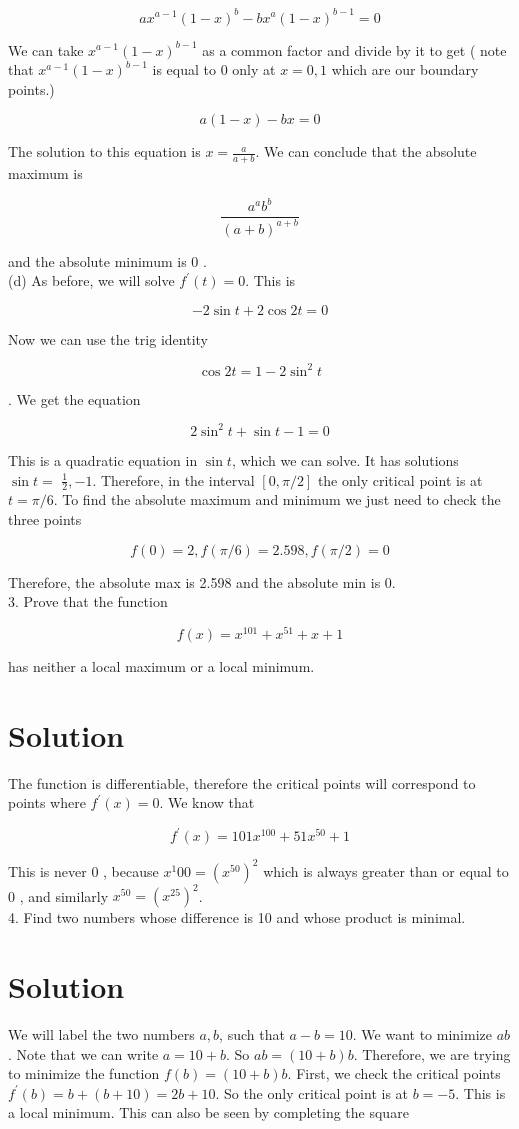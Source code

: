\documentclass[10pt]{article}
\begin{document}
$$
a x^{a-1}(1-x)^{b}-b x^{a}(1-x)^{b-1}=0
$$

We can take $x^{a-1}(1-x)^{b-1}$ as a common factor and divide by it to get ( note that $x^{a-1}(1-x)^{b-1}$ is equal to 0 only at $x=0,1$ which are our boundary points.)

$$
a(1-x)-b x=0
$$

The solution to this equation is $x=\frac{a}{a+b}$. We can conclude that the absolute maximum is

$$
\frac{a^{a} b^{b}}{(a+b)^{a+b}}
$$

and the absolute minimum is 0 .\\
(d) As before, we will solve $f^{\prime}(t)=0$. This is

$$
-2 \sin t+2 \cos 2 t=0
$$

Now we can use the trig identity

$$
\cos 2 t=1-2 \sin ^{2} t
$$

. We get the equation

$$
2 \sin ^{2} t+\sin t-1=0
$$

This is a quadratic equation in $\sin t$, which we can solve. It has solutions $\sin t=$ $\frac{1}{2},-1$. Therefore, in the interval $[0, \pi / 2]$ the only critical point is at $t=\pi / 6$. To find the absolute maximum and minimum we just need to check the three points

$$
f(0)=2, f(\pi / 6)=2.598, f(\pi / 2)=0
$$

Therefore, the absolute max is 2.598 and the absolute min is 0.\\
3. Prove that the function

$$
f(x)=x^{101}+x^{51}+x+1
$$

has neither a local maximum or a local minimum.

\section*{Solution}
The function is differentiable, therefore the critical points will correspond to points where $f^{\prime}(x)=0$. We know that

$$
f^{\prime}(x)=101 x^{100}+51 x^{50}+1
$$

This is never 0 , because $x^{1} 00=\left(x^{50}\right)^{2}$ which is always greater than or equal to 0 , and similarly $x^{50}=\left(x^{25}\right)^{2}$.\\
4. Find two numbers whose difference is 10 and whose product is minimal.

\section*{Solution}
We will label the two numbers $a, b$, such that $a-b=10$. We want to minimize $a b$. Note that we can write $a=10+b$. So $a b=(10+b) b$. Therefore, we are trying to minimize the function $f(b)=(10+b) b$. First, we check the critical points $f^{\prime}(b)=b+(b+10)=2 b+10$. So the only critical point is at $b=-5$. This is a local minimum. This can also be seen by completing the square
\end{document}
